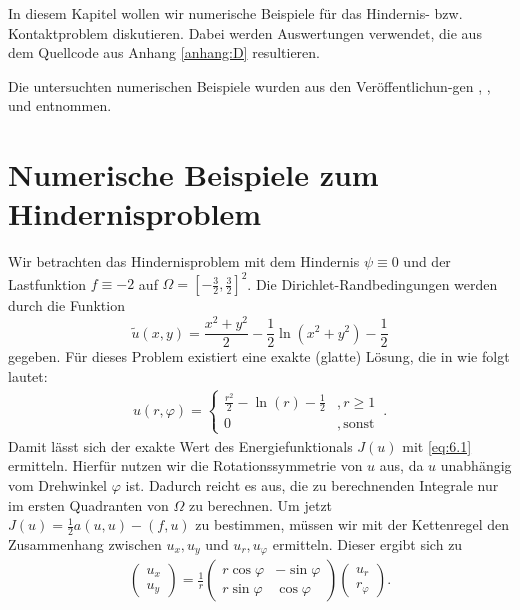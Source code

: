 \label{kap:6}


In diesem Kapitel wollen wir numerische Beispiele für das Hindernis- bzw. Kontaktproblem diskutieren. Dabei werden Auswertungen verwendet, die aus dem Quellcode aus Anhang \ref{anhang:D} resultieren.

Die untersuchten numerischen Beispiele wurden aus den Veröffentlichun-gen \cite{SiebVee}, \cite{BraeCar}, \cite{BraeCar2} und \cite{CarWri} entnommen.


\section{Numerische Beispiele zum Hindernisproblem}
\label{kap:6.1}

\begin{bsp}\label{bsp:6.1}
Wir betrachten das Hindernisproblem mit dem Hindernis $\psi \equiv 0$ und der Lastfunktion $f\equiv -2$ auf $\Omega = [-\frac 32,\frac 32]^2$. Die Dirichlet-Randbedingungen werden durch die Funktion
\[
	\tilde u(x,y) = \frac{x^2+y^2}2-\frac 12 \ln(x^2+y^2)-\frac 12
\]
gegeben. Für dieses Problem existiert eine exakte (glatte) Lösung, die in  wie folgt lautet:
\begin{align}\label{eq:6.1}
	u(r,\varphi) = \begin{cases}
					\frac{r^2}2-\ln (r)-\frac 12 & , r \ge 1 \\
					0 & , \, \text{sonst}
				\end{cases} \, .
\end{align}
Damit lässt sich der exakte Wert des Energiefunktionals $J(u)$ mit \eqref{eq:6.1} ermitteln. Hierfür nutzen wir die Rotationssymmetrie von $u$ aus, da $u$ unabhängig vom Drehwinkel $\varphi$ ist. Dadurch reicht es aus, die zu berechnenden Integrale nur im ersten Quadranten von $\Omega$ zu berechnen. Um jetzt $J(u)= \frac 12 a(u,u)-(f,u)$ zu bestimmen, müssen wir mit der Kettenregel den Zusammenhang zwischen $u_x,u_y$ und $u_r,u_\varphi$ ermitteln. Dieser ergibt sich zu
\begin{align}\label{eq:6.2}
	\begin{pmatrix} u_x \\ u_y \end{pmatrix} = \frac 1r \begin{pmatrix} r \cos \varphi & -\sin\varphi \\ r \sin\varphi & \cos\varphi \end{pmatrix} \begin{pmatrix} u_r \\ r_\varphi \end{pmatrix}.
\end{align}


\end{bsp}
